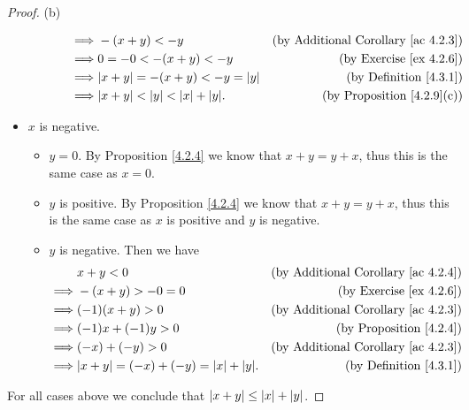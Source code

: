 \begin{proof}{(b)}
\begin{itemize}
\begin{itemize}
\begin{itemize}
\begin{align*}
                                      \implies & -(x + y) < -y                                  & \text{(by Additional Corollary \ref{ac 4.2.3})} \\
                                      \implies & 0 = -0 < -(x + y) < -y                         & \text{(by Exercise \ref{ex 4.2.6})}             \\
                                      \implies & \abs*{x + y} = -(x + y) < -y = \abs*{y}        & \text{(by Definition \ref{4.3.1})}              \\
                                      \implies & \abs*{x + y} < \abs*{y} < \abs*{x} + \abs*{y}. & \text{(by Proposition \ref{4.2.9}(c))}
                                  \end{align*}
                        \end{itemize}
              \end{itemize}
        \item \(x\) is negative.
              \begin{itemize}
                  \item \(y = 0\).
                        By Proposition \ref{4.2.4} we know that \(x + y = y + x\), thus this is the same case as \(x = 0\).
                  \item \(y\) is positive.
                        By Proposition \ref{4.2.4} we know that \(x + y = y + x\), thus this is the same case as \(x\) is positive and \(y\) is negative.
                  \item \(y\) is negative.
                        Then we have
                        \begin{align*}
                                     & x + y < 0                                         & \text{(by Additional Corollary \ref{ac 4.2.4})} \\
                            \implies & -(x + y) > -0 = 0                                 & \text{(by Exercise \ref{ex 4.2.6})}             \\
                            \implies & (-1)(x + y) > 0                                   & \text{(by Additional Corollary \ref{ac 4.2.3})} \\
                            \implies & (-1)x + (-1)y > 0                                 & \text{(by Proposition \ref{4.2.4})}             \\
                            \implies & (-x) + (-y) > 0                                   & \text{(by Additional Corollary \ref{ac 4.2.3})} \\
                            \implies & \abs*{x + y} = (-x) + (-y) = \abs*{x} + \abs*{y}. & \text{(by Definition \ref{4.3.1})}
                        \end{align*}
              \end{itemize}
    \end{itemize}
    For all cases above we conclude that \(\abs*{x + y} \leq \abs*{x} + \abs*{y}\).
\end{proof}

